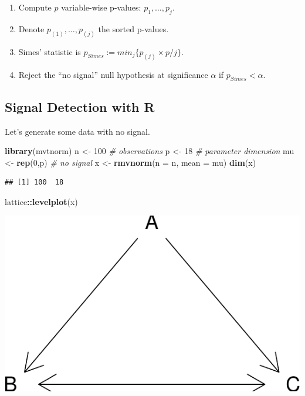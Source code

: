 \documentclass[]{book}
\newenvironment{Shaded}{\begin{snugshade}}{\end{snugshade}}
\newcommand{\KeywordTok}[1]{\textcolor[rgb]{0.13,0.29,0.53}{\textbf{#1}}}
\newcommand{\DataTypeTok}[1]{\textcolor[rgb]{0.13,0.29,0.53}{#1}}
\newcommand{\DecValTok}[1]{\textcolor[rgb]{0.00,0.00,0.81}{#1}}
\newcommand{\StringTok}[1]{\textcolor[rgb]{0.31,0.60,0.02}{#1}}
\newcommand{\CommentTok}[1]{\textcolor[rgb]{0.56,0.35,0.01}{\textit{#1}}}
\newcommand{\OperatorTok}[1]{\textcolor[rgb]{0.81,0.36,0.00}{\textbf{#1}}}
\newcommand{\NormalTok}[1]{#1}
\providecommand{\tightlist}{%
  \setlength{\itemsep}{0pt}\setlength{\parskip}{0pt}}
\theoremstyle{definition}
\theoremstyle{definition}
\theoremstyle{definition}
\theoremstyle{remark}
\begin{document}
\begin{enumerate}
\def\labelenumi{\arabic{enumi}.}
\tightlist
\item
  Compute \(p\) variable-wise p-values: \(p_1,\dots,p_j\).
\item
  Denote \(p_{(1)},\dots,p_{(j)}\) the sorted p-values.
\item
  Simes' statistic is \(p_{Simes}:=min_j\{p_{(j)} \times p/j\}\).
\item
  Reject the ``no signal'' null hypothesis at significance \(\alpha\) if
  \(p_{Simes}<\alpha\).
\end{enumerate}

\subsection{Signal Detection with R}\label{signal-detection-with-r}

Let's generate some data with no signal.

\begin{Shaded}
\begin{Highlighting}[]
\KeywordTok{library}\NormalTok{(mvtnorm)}
\NormalTok{n <-}\StringTok{ }\DecValTok{100} \CommentTok{# observations}
\NormalTok{p <-}\StringTok{ }\DecValTok{18} \CommentTok{# parameter dimension}
\NormalTok{mu <-}\StringTok{ }\KeywordTok{rep}\NormalTok{(}\DecValTok{0}\NormalTok{,p) }\CommentTok{# no signal}
\NormalTok{x <-}\StringTok{ }\KeywordTok{rmvnorm}\NormalTok{(}\DataTypeTok{n =}\NormalTok{ n, }\DataTypeTok{mean =}\NormalTok{ mu)}
\KeywordTok{dim}\NormalTok{(x)}
\end{Highlighting}
\end{Shaded}

\begin{verbatim}
## [1] 100  18
\end{verbatim}

\begin{Shaded}
\begin{Highlighting}[]
\NormalTok{lattice}\OperatorTok{::}\KeywordTok{levelplot}\NormalTok{(x)}
\end{Highlighting}
\end{Shaded}

\includegraphics[width=0.5\linewidth]{Rcourse_files/figure-latex/unnamed-chunk-222-1}
\end{document}
